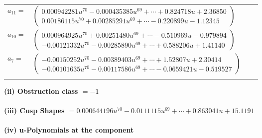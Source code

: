 \documentclass[1p]{elsarticle_modified}
\theoremstyle{definition}
\begin{document}
\begin{tabular}{m{7pt} m{180pt} m{7pt} m{180pt} }
\flushright $a_{11}=$&$\begin{pmatrix}0.000942281 u^{70}-0.000435385 u^{69}+\cdots+0.824718 u+2.36850\\0.00186115 u^{70}+0.00285291 u^{69}+\cdots-0.220899 u-1.12345\end{pmatrix}$ \\
\flushright $a_{10}=$&$\begin{pmatrix}0.000964925 u^{70}+0.00251480 u^{69}+\cdots-0.510969 u-0.979894\\-0.00121332 u^{70}-0.00285890 u^{69}+\cdots+0.588206 u+1.41140\end{pmatrix}$ \\
\flushright $a_{7}=$&$\begin{pmatrix}-0.00150252 u^{70}-0.00389403 u^{69}+\cdots+1.52807 u+2.30414\\-0.00101635 u^{70}-0.00117586 u^{69}+\cdots-0.0659421 u-0.519527\end{pmatrix}$\\&\end{tabular}
\flushleft \textbf{(ii) Obstruction class $= -1$}\\~\\
\flushleft \textbf{(iii) Cusp Shapes $= 0.000644196 u^{70}-0.0111115 u^{69}+\cdots+0.863041 u+15.1191$}\\~\\
\newpage\renewcommand{\arraystretch}{1}
\flushleft \textbf{(iv) u-Polynomials at the component}\newline \\
\end{document}

